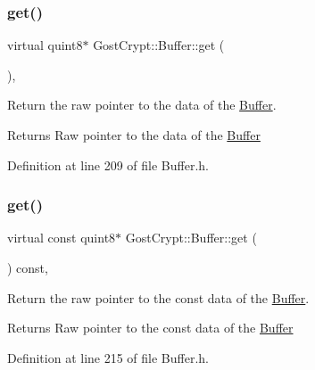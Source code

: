\subsubsection{\texorpdfstring{get()}{get()}\hspace{0.1cm}{\footnotesize\ttfamily [1/2]}}
{\footnotesize\ttfamily virtual quint8$\ast$ Gost\+Crypt\+::\+Buffer\+::get (\begin{DoxyParamCaption}{ }\end{DoxyParamCaption})\hspace{0.3cm}{\ttfamily [inline]}, {\ttfamily [virtual]}}



Return the raw pointer to the data of the \hyperlink{class_gost_crypt_1_1_buffer}{Buffer}. 

\begin{DoxyReturn}{Returns}
Raw pointer to the data of the \hyperlink{class_gost_crypt_1_1_buffer}{Buffer} 
\end{DoxyReturn}


Definition at line 209 of file Buffer.\+h.

\mbox{\label{class_gost_crypt_1_1_buffer_ae29a4a45510cadfdda632770f5b56d86}} 
\subsubsection{\texorpdfstring{get()}{get()}\hspace{0.1cm}{\footnotesize\ttfamily [2/2]}}
{\footnotesize\ttfamily virtual const quint8$\ast$ Gost\+Crypt\+::\+Buffer\+::get (\begin{DoxyParamCaption}{ }\end{DoxyParamCaption}) const\hspace{0.3cm}{\ttfamily [inline]}, {\ttfamily [virtual]}}



Return the raw pointer to the const data of the \hyperlink{class_gost_crypt_1_1_buffer}{Buffer}. 

\begin{DoxyReturn}{Returns}
Raw pointer to the const data of the \hyperlink{class_gost_crypt_1_1_buffer}{Buffer} 
\end{DoxyReturn}


Definition at line 215 of file Buffer.\+h.

\mbox{\label{class_gost_crypt_1_1_buffer_acb9b5e46856fd25584e459d5f998adf2}} 
